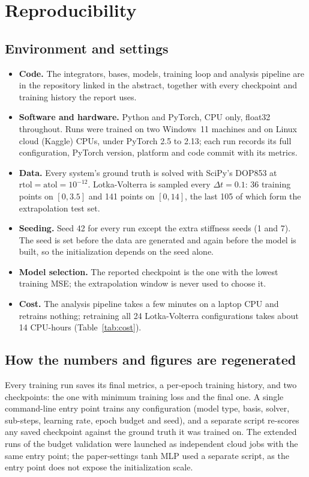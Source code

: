 \section{Reproducibility}
\label{app:repro}

\subsection{Environment and settings}

\begin{itemize}[leftmargin=*,itemsep=1pt,topsep=2pt]
\item \textbf{Code.} The integrators, bases, models, training loop and
  analysis pipeline are in the repository linked in the abstract, together
  with every checkpoint and training history the report uses.
\item \textbf{Software and hardware.} Python and PyTorch, CPU only, float32
  throughout. Runs were trained on two Windows~11 machines and on Linux cloud
  (Kaggle) CPUs, under PyTorch 2.5 to 2.13; each run records its full
  configuration, PyTorch version, platform and code commit with its metrics.
\item \textbf{Data.} Every system's ground truth is solved with SciPy's
  DOP853 at $\text{rtol}=\text{atol}=10^{-12}$. Lotka-Volterra is sampled
  every $\Delta t=0.1$:
  36 training points on $[0,3.5]$ and 141 points on $[0,14]$, the last
  105 of which form the extrapolation test set.
\item \textbf{Seeding.} Seed 42 for every run except the extra stiffness
  seeds (1 and 7). The seed is set before the data are generated and again
  before the model is built, so the initialization depends on the seed alone.
\item \textbf{Model selection.} The reported checkpoint is the one with the
  lowest training MSE; the extrapolation window is never used to choose it.
\item \textbf{Cost.} The analysis pipeline takes a few minutes on a laptop
  CPU and retrains nothing; retraining all 24 Lotka-Volterra configurations
  takes about 14 CPU-hours (Table~\ref{tab:cost}).
\end{itemize}

\subsection{How the numbers and figures are regenerated}

Every training run saves its final metrics, a per-epoch training history, and
two checkpoints: the one with minimum training loss and the final one. A
single command-line entry point trains any configuration (model type, basis,
solver, sub-steps, learning rate, epoch budget and seed), and a separate
script re-scores any saved checkpoint against the ground truth it was
trained on. The extended runs of the budget validation were launched as
independent cloud jobs with the same entry point; the paper-settings tanh
MLP used a separate script, as the entry point does not expose the
initialization scale.

